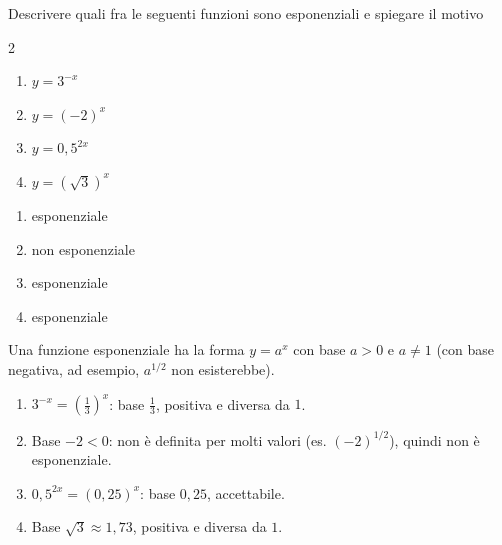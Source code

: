 \begin{question}[ID=1.1, subtitle={Riconoscimento di funzioni esponenziali}, difficulty=facile, tags={definizione, esponenziali}]
Descrivere quali fra le seguenti funzioni sono esponenziali e spiegare il motivo
\begin{center}\begin{minipage}{0.92\linewidth}
\begin{multicols}{2}
\begin{enumerate}[leftmargin=3.2cm]
\item $y=3^{-x}$
\item $y=(-2)^x$
\item $y=0{,}5^{2x}$
\item $y=(\sqrt{3})^x$
\end{enumerate}
\end{multicols}
\end{minipage}\end{center}
\begin{solution}
\begin{enumerate}
    \item esponenziale
    \item non esponenziale
    \item esponenziale
    \item esponenziale
\end{enumerate}
\end{solution}
\begin{explanation}
Una funzione esponenziale ha la forma $y=a^x$ con base $a>0$ e $a\neq1$ (con base negativa, ad esempio, $a^{1/2}$ non esisterebbe).
\begin{enumerate}
    \item $3^{-x}=\left(\tfrac13\right)^x$: base $\tfrac13$, positiva e diversa da $1$.
    \item Base $-2<0$: non è definita per molti valori (es. $(-2)^{1/2}$), quindi non è esponenziale.
    \item $0{,}5^{2x}=(0{,}25)^x$: base $0{,}25$, accettabile.
    \item Base $\sqrt3\approx1{,}73$, positiva e diversa da $1$.
\end{enumerate}
\end{explanation}
\end{question}


